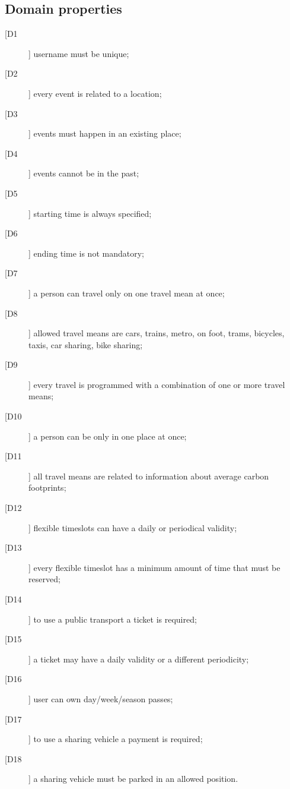 \subsection{Domain properties}

\begin{description}
\item[[D1]] username must be unique;
\item[[D2]] every event is related to a location;
\item[[D3]] events must happen in an existing place;
\item[[D4]] events cannot be in the past;
\item[[D5]] starting time is always specified;
\item[[D6]] ending time is not mandatory;
\item[[D7]] a person can travel only on one travel mean at once; 
\item[[D8]] allowed travel means are cars, trains, metro, on foot, trams, bicycles, taxis, car sharing, bike sharing;
\item[[D9]] every travel is programmed with a combination of one or more travel means;
\item[[D10]] a person can be only in one place at once;
\item[[D11]] all travel means are related to information about average carbon footprints; 
\item[[D12]] flexible timeslots can have a daily or periodical validity;
\item[[D13]] every flexible timeslot has a minimum amount of time that must be reserved;
\item[[D14]] to use a public transport a ticket is required; 
\item[[D15]] a ticket may have a daily validity or a different periodicity; 
\item[[D16]] user can own day/week/season passes;
\item[[D17]] to use a sharing vehicle a payment is required;
\item[[D18]] a sharing vehicle must be parked in an allowed position.
\end{description}

